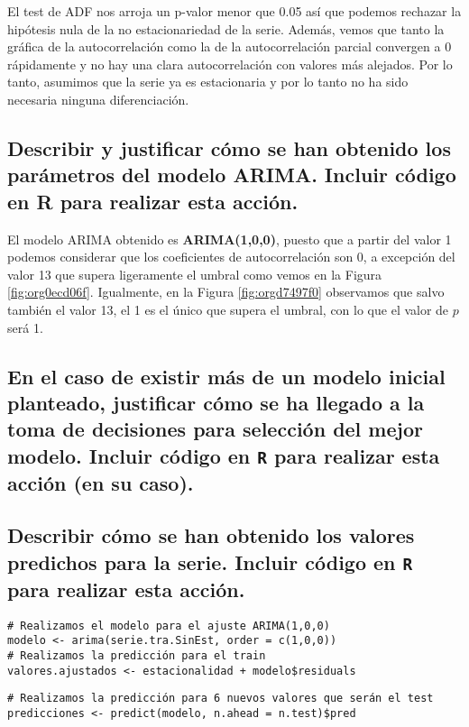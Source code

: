\documentclass[11pt]{article}
\begin{document}
El test de ADF nos arroja un p-valor menor que 0.05 así que podemos
rechazar la hipótesis nula de la no estacionariedad de la
serie. Además, vemos que tanto la gráfica de la autocorrelación
como la de la autocorrelación parcial convergen a 0 rápidamente y
no hay una clara autocorrelación con valores más alejados.  Por lo
tanto, asumimos que la serie ya es estacionaria y por lo tanto no ha
sido necesaria ninguna diferenciación.

\subsection{Describir y justificar cómo se han obtenido los parámetros del modelo ARIMA. Incluir código en R para realizar esta acción.}
\label{sec:org78e9cd4}


El modelo ARIMA obtenido es \textbf{ARIMA(1,0,0)}, puesto que a partir del
valor 1 podemos considerar que los coeficientes de autocorrelación son
0, a excepción del valor 13 que supera ligeramente el
umbral como vemos en la Figura \ref{fig:org0ecd06f}. Igualmente, en la Figura
\ref{fig:orgd7497f0} observamos que salvo también el valor 13, el 1 es el único
que supera el umbral, con lo que el valor de \(p\) será 1.


\subsection{En el caso de existir más de un modelo inicial planteado, justificar cómo se ha llegado a la toma de decisiones para selección del mejor modelo. Incluir código en \texttt{R} para realizar esta acción (en su caso).}
\label{sec:org94c0ac0}




\subsection{Describir cómo se han obtenido los valores predichos para la serie. Incluir código en \texttt{R} para realizar esta acción.}
\label{sec:orgc4551f6}


\begin{verbatim}
# Realizamos el modelo para el ajuste ARIMA(1,0,0)
modelo <- arima(serie.tra.SinEst, order = c(1,0,0))
# Realizamos la predicción para el train 
valores.ajustados <- estacionalidad + modelo$residuals
\end{verbatim}


\begin{verbatim}
# Realizamos la predicción para 6 nuevos valores que serán el test
predicciones <- predict(modelo, n.ahead = n.test)$pred
\end{verbatim}
\end{document}
